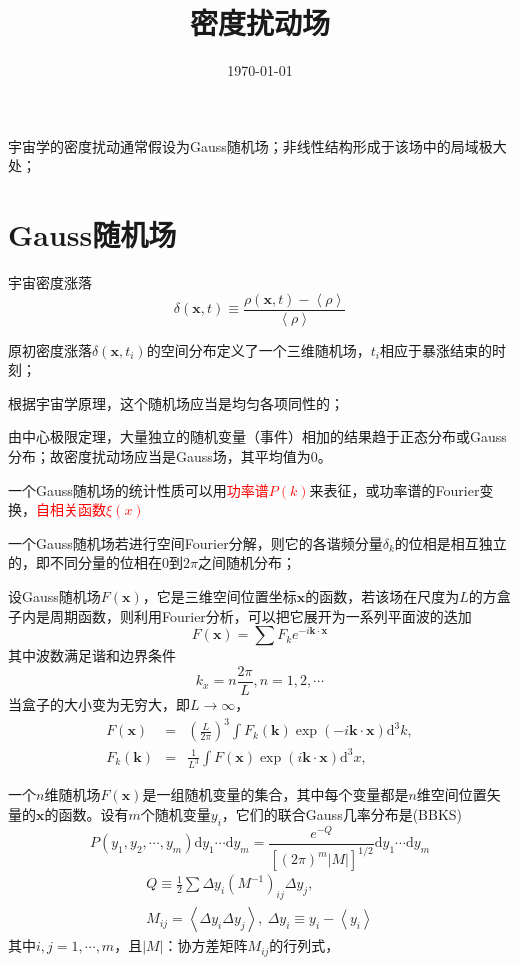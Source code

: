 \documentclass[12pt,a4paper]{article}
\title{密度扰动场}
\author{}
\date{\today}
\renewcommand{\vec}[1]{\boldsymbol{#1}}
\newcommand{\dif}{\mathrm{d}}
\begin{document}
\maketitle

宇宙学的密度扰动通常假设为Gauss随机场；非线性结构形成于该场中的局域极大处；

\section{Gauss随机场}
宇宙密度涨落
\begin{equation}
\delta(\vec{x}, t) \equiv \frac{\rho(\vec{x}, t) -\left\langle \rho \right\rangle}{\left\langle \rho \right\rangle}
\end{equation}

原初密度涨落$\delta(\vec{x}, t_i)$的空间分布定义了一个三维随机场，$t_i$相应于暴涨结束的时刻；

根据宇宙学原理，这个随机场应当是均匀各项同性的；

由中心极限定理，大量独立的随机变量（事件）相加的结果趋于正态分布或Gauss分布；故密度扰动场应当是Gauss场，其平均值为0。

一个Gauss随机场的统计性质可以用\textcolor{red}{功率谱$P(k)$}来表征，或功率谱的Fourier变换，\textcolor{red}{自相关函数$\xi(x)$}

一个Gauss随机场若进行空间Fourier分解，则它的各谐频分量$\delta_k$的位相是相互独立的，即不同分量的位相在$0$到$2\pi$之间随机分布；

设Gauss随机场$F(\vec{x})$，它是三维空间位置坐标$\vec{x}$的函数，若该场在尺度为$L$的方盒子内是周期函数，则利用Fourier分析，可以把它展开为一系列平面波的迭加
\begin{equation}
F(\vec{x}) = \sum F_k e^{-i\vec{k}\cdot \vec{x}}
\end{equation}
其中波数满足谐和边界条件
\begin{equation}
k_x = n\frac{2\pi}{L}, n = 1, 2, \cdots
\end{equation}
当盒子的大小变为无穷大，即$L\rightarrow \infty$，
\begin{eqnarray}
\nonumber F(\vec{x}) &=& \left(\frac{L}{2\pi} \right)^3  \int F_k(\vec{k}) \exp(-i\vec{k}\cdot \vec{x}) \dif^3 k, \\
F_k(\vec{k}) &=& \frac{1}{L^3}  \int F(\vec{x}) \exp(i\vec{k}\cdot \vec{x}) \dif^3 x,
\end{eqnarray}

一个$n$维随机场$F(\vec{x})$是一组随机变量的集合，其中每个变量都是$n$维空间位置矢量的$\vec{x}$的函数。设有$m$个随机变量$y_i$，它们的联合Gauss几率分布是(BBKS)
\begin{equation}
P(y_1, y_2, \cdots, y_m) \dif y_1 \cdots \dif y_m = \frac{e^{-Q}}{[(2\pi)^m |M|]^{1/2}} \dif y_1 \cdots \dif y_m 
\end{equation}
\begin{eqnarray}
Q \equiv \frac{1}{2} \sum \Delta y_i (M^{-1})_{ij} \Delta y_j, \\ 
M_{ij} = \left\langle \Delta y_i \Delta y_j \right\rangle, ~ \Delta y_i \equiv y_i -\left\langle y_i \right\rangle
\end{eqnarray}
其中$i,j = 1, \cdots, m$，且$|M|$：协方差矩阵$M_{ij}$的行列式，
\end{document}
